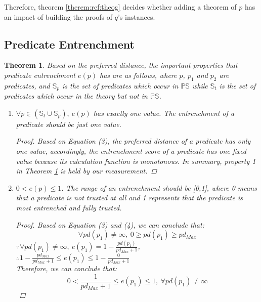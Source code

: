 \documentclass[11pt,letterpaper]{article}
\newtheorem{theorem}{Theorem}[section]
\newcommand{\ps}{\mathbb{PS}}
\begin{document}
Therefore, theorem \ref{therem:ref:theog} decides whether adding a theorem of $p$ has an impact of building the proofs of $q$’s instances.

\subsection{Predicate Entrenchment}

\begin{theorem}\label{spec:pe}
Based on the  preferred distance, the important properties that predicate entrenchment $e(p)$ has are as follows, where $p$, $p_{1}$ and $p_{2}$ are predicates, and $\mathbb{S}_{p}$ is the set of predicates which occur in $\ps$ while $\mathbb{S}_{t}$ is the set of predicates which occur in the theory but not in $\ps$.
\begin{enumerate}
\item $\forall p \in (\mathbb{S}_{t} \cup \mathbb{S}_{p}),\ e(p)$ has exactly one value.\newline
\textnormal{The entrenchment of a predicate should be just one value.}


\begin{proof}

Based on Equation (3), the preferred distance of a predicate has only one value, accordingly, the entrenchment score of a predicate has one fixed value because its calculation function is monotonous. In summary, property 1 in Theorem \ref{spec:pe} is held by our measurement.
\end{proof}

\item $ 0 < e(p) \leq 1$. \newline
\textnormal{The range of an entrenchment should be [0,1], where 0 means that a predicate is not trusted at all and 1  represents that the predicate is most entrenched and fully trusted.}
\begin{proof}
Based on Equation (3) and (4), we can conclude that:
\begin{equation*}
    \forall pd(p_1) \neq \infty,\ 0\geq pd(p_1)\geq pd_{Max}
\end{equation*}
$\because \forall pd(p_1) \neq \infty,\ e(p_1) = 1- \frac{pd(p_1)}{pd_{Max}+1}$,\\
$\therefore 1- \frac{pd_{Max}}{pd_{Max}+1}  \leq e(p_1) \leq1- \frac{0}{pd_{Max}+1}$\\
Therefore, we can conclude that:
\begin{equation}\label{equ:11}
    0 < \frac{1}{pd_{Max}+1} \leq e(p_1)\leq 1,\ \forall pd(p_1) \neq \infty
\end{equation}



\end{proof}
\end{enumerate}
\end{theorem}
\end{document}

